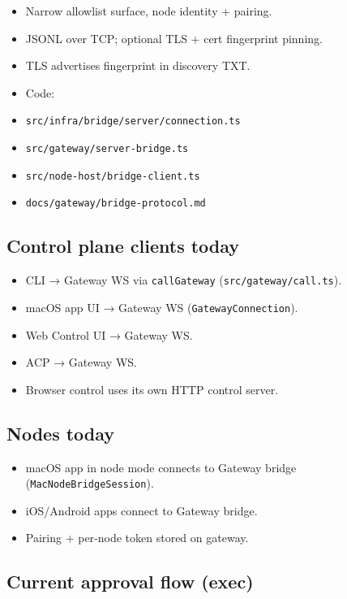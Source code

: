 \begin{itemize}
  \item Narrow allowlist surface, node identity + pairing.
  \item JSONL over TCP; optional TLS + cert fingerprint pinning.
  \item TLS advertises fingerprint in discovery TXT.
  \item Code:
  \item \texttt{src/infra/bridge/server/connection.ts}
  \item \texttt{src/gateway/server-bridge.ts}
  \item \texttt{src/node-host/bridge-client.ts}
  \item \texttt{docs/gateway/bridge-protocol.md}
\end{itemize}


\subsection{Control plane clients today}


\begin{itemize}
  \item CLI → Gateway WS via \texttt{callGateway} (\texttt{src/gateway/call.ts}).
  \item macOS app UI → Gateway WS (\texttt{GatewayConnection}).
  \item Web Control UI → Gateway WS.
  \item ACP → Gateway WS.
  \item Browser control uses its own HTTP control server.
\end{itemize}


\subsection{Nodes today}


\begin{itemize}
  \item macOS app in node mode connects to Gateway bridge (\texttt{MacNodeBridgeSession}).
  \item iOS/Android apps connect to Gateway bridge.
  \item Pairing + per‑node token stored on gateway.
\end{itemize}


\subsection{Current approval flow (exec)}



